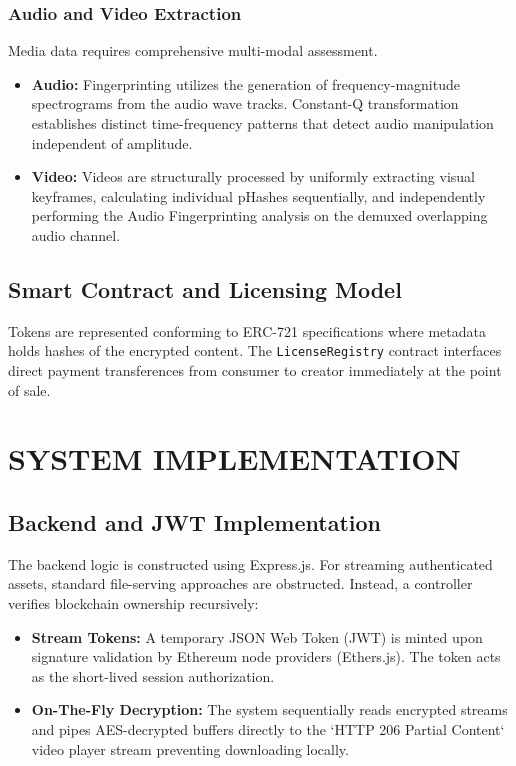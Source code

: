 \documentclass[12pt,a4paper]{report}
\begin{document}
\subsection{Audio and Video Extraction}
Media data requires comprehensive multi-modal assessment. 
\begin{itemize}
    \item \textbf{Audio:} Fingerprinting utilizes the generation of frequency-magnitude spectrograms from the audio wave tracks. Constant-Q transformation establishes distinct time-frequency patterns that detect audio manipulation independent of amplitude.
    \item \textbf{Video:} Videos are structurally processed by uniformly extracting visual keyframes, calculating individual pHashes sequentially, and independently performing the Audio Fingerprinting analysis on the demuxed overlapping audio channel.
\end{itemize}

\section{Smart Contract and Licensing Model}
Tokens are represented conforming to ERC-721 specifications where metadata holds hashes of the encrypted content. The \texttt{LicenseRegistry} contract interfaces direct payment transferences from consumer to creator immediately at the point of sale. 

\chapter{SYSTEM IMPLEMENTATION}

\section{Backend and JWT Implementation}
The backend logic is constructed using Express.js. For streaming authenticated assets, standard file-serving approaches are obstructed.
Instead, a controller verifies blockchain ownership recursively:
\begin{itemize}
    \item \textbf{Stream Tokens:} A temporary JSON Web Token (JWT) is minted upon signature validation by Ethereum node providers (Ethers.js). The token acts as the short-lived session authorization.
    \item \textbf{On-The-Fly Decryption:} The system sequentially reads encrypted streams and pipes AES-decrypted buffers directly to the `HTTP 206 Partial Content` video player stream preventing downloading locally.
\end{itemize}
\end{document}
